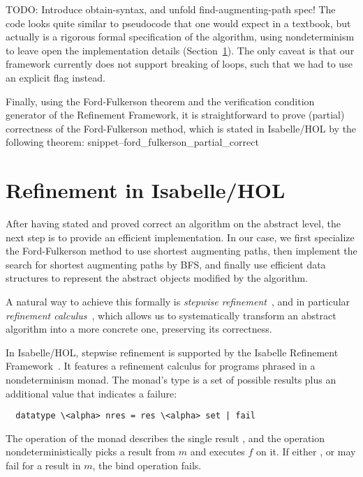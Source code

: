 \documentclass{llncs}
\newcommand{\Snippet}[1]{\csname snippet--#1\endcsname}
\begin{document}
TODO: Introduce obtain-syntax, and unfold find-augmenting-path spec!
The code looks quite similar to pseudocode that one would expect in a textbook, but actually is a rigorous formal specification of the algorithm, using nondeterminism to leave open the implementation details (\cf Section~\ref{sec:refinement}). The only caveat is that our framework currently does not support breaking of loops, such that we had to use an explicit flag instead. 

Finally, using the Ford-Fulkerson theorem and the verification condition generator of the Refinement Framework, it is straightforward to prove (partial) correctness of
the Ford-Fulkerson method, which is stated in Isabelle/HOL by the following theorem:
\Snippet{ford_fulkerson_partial_correct}

\section{Refinement in Isabelle/HOL}\label{sec:refinement}
After having stated and proved correct an algorithm on the abstract level, the next step is to provide an efficient implementation. 
In our case, we first specialize the Ford-Fulkerson method to use shortest augmenting paths, then implement the search for shortest augmenting paths by BFS, and finally use efficient data structures to represent the abstract objects modified by the algorithm. 

A natural way to achieve this formally is \emph{stepwise refinement}~\cite{Wirth71}, and in particular \emph{refinement calculus}~\cite{Back78,BaWr98}, which allows us to systematically transform an abstract algorithm into a more concrete one, preserving its correctness.

In Isabelle/HOL, stepwise refinement is supported by the Isabelle Refinement Framework~\cite{LaTu12}. 
It features a refinement calculus for programs phrased in a nondeterminism monad. 
The monad's type is a set of possible results plus an additional value that indicates a failure:
\begin{lstlisting}
  datatype \<alpha> nres = res \<alpha> set | fail
\end{lstlisting}
The operation  of the monad describes the single result , and the 
operation  nondeterministically picks a result from $m$ and executes $f$ on it. 
If either , or  may fail for a result in $m$, the bind operation fails.
\end{document}
